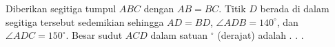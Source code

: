 Diberikan segitiga tumpul $ABC$ dengan $AB = BC$. Titik $D$ berada di dalam segitiga tersebut sedemikian sehingga $AD = BD$, $\angle ADB = 140^\circ$, dan $\angle ADC = 150^\circ$. Besar sudut $ACD$ dalam satuan $^\circ$ (derajat) adalah . . .